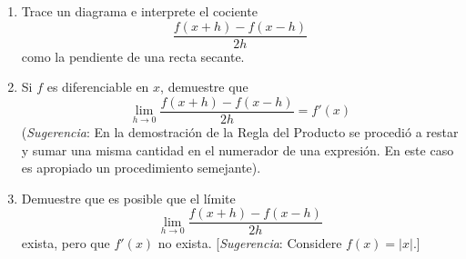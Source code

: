 \item \par
\begin{enumerate}
    \item[(a)] Trace un diagrama e interprete el cociente
    $$\frac{f(x + h) - f(x - h)}{2h}$$
    como la pendiente de una recta secante.
    \item[(b)] Si $f$ es diferenciable en $x$, demuestre que
    $$\lim_{h \to 0} \frac{f(x + h) - f(x - h)}{2h} = f'(x)$$
    (\textit{Sugerencia}: En la demostración de la Regla del Producto se procedió a restar y sumar una misma cantidad en el numerador de una expresión. En este caso es apropiado un procedimiento semejante).
    \item[(c)] Demuestre que es posible que el límite
    $$\lim_{h \to 0} \frac{f(x + h) - f(x - h)}{2h}$$
    exista, pero que $f'(x)$ no exista. [\textit{Sugerencia}: Considere $f(x) = |x|$.]
\end{enumerate}
